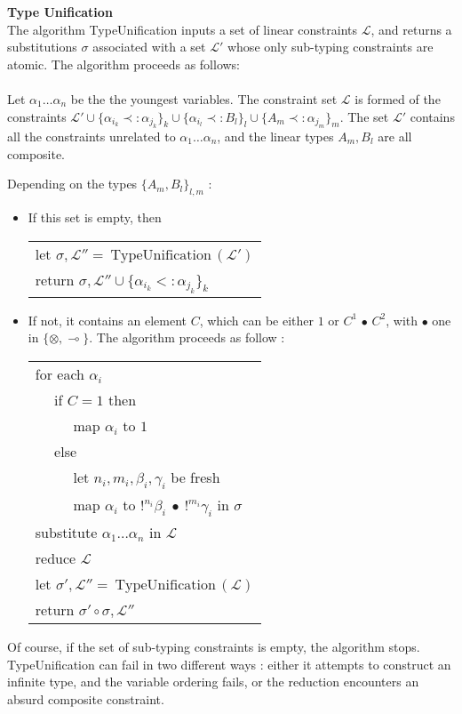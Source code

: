 \begin{defn}{\bf Type Unification} \\
	The algorithm TypeUnification inputs a set of linear constraints $\mathcal{L}$, and returns
	a substitutions $\sigma$ associated with a set $\mathcal{L'}$ whose only sub-typing constraints are atomic.
	The algorithm proceeds as follows: \\
	\\
  Let $\alpha_1 \dots \alpha_n$ be the the youngest variables. The constraint set $\mathcal{L}$ is formed of the constraints
  $\mathcal{L'} \cup \{ \alpha_{i_k} \prec: \alpha_{j_k} \}_k \cup \{ \alpha_{i_l} \prec: B_l \}_l
	\cup \{ A_m \prec: \alpha_{j_m} \}_m$.
  The set $\mathcal{L'}$ contains all the constraints unrelated to $\alpha_1 \dots \alpha_n$,
  and the linear types $A_m, B_l$ are all composite.
  		
  Depending on the types $\{A_m, B_l\}_{l, m}$ :
	\begin{itemize}
		\item If this set is empty, then \\
			\begin{tabular}{l}
				let $\sigma, \mathcal{L''} = ~\text{TypeUnification}\,(\mathcal{L'})$ \\
				return $\sigma, \mathcal{L''} \cup \{ \alpha_{i_k} <: \alpha_{j_k} \}_k$
			\end{tabular}
	  
	  \item If not, it contains an element $C$, which can be either $1$ or $C^1 \,\bullet \, C^2$, with $\bullet$ one in $\{ \otimes, \multimap \}$.
		  The algorithm proceeds as follow :\\
	  	\begin{tabular}{l}
	  		for each $\alpha_i$ \\
	  		~~ if $C = 1$ then \\
	  		~~ ~~ map $\alpha_i$ to $1$ \\
	  		~~ else \\
	  		~~ ~~ let $n_i, m_i, \beta_i, \gamma_i$ be fresh \\
	  		~~ ~~ map $\alpha_i$ to $!^{n_i} \beta_i ~\bullet~ !^{m_i}\gamma_i$ in $\sigma$ \\
	  		substitute $\alpha_1 \dots \alpha_n$ in $\mathcal{L}$ \\
	  		reduce $\mathcal{L}$ \\
	  		let $\sigma', \mathcal{L''} = ~\text{TypeUnification}\,(\mathcal{L})$ \\
	  		return $\sigma' \circ \sigma, \mathcal{L''}$
	  	\end{tabular}
  \end{itemize}

  Of course, if the set of sub-typing constraints is empty, the algorithm stops.
  TypeUnification can fail in two different ways : either it attempts to construct an infinite
  type, and the variable ordering fails, or the reduction encounters an absurd composite constraint.
\end{defn}

